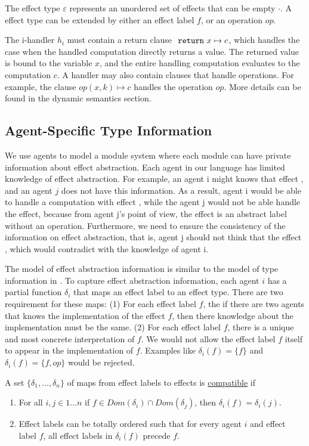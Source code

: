 The effect type $\varepsilon$ represents an unordered set of effects that can be empty $\cdot$. A effect type can be extended by either an effect label $f$, or an operation $op$.

The i-handler $h_i$ must contain a return clause $\ \texttt{return}\  x \mapsto c$, which handles the case when the handled computation directly returns a value. The returned value is bound to the variable $x$, and the entire handling computation evaluates to the computation $c$. A handler may also contain clauses that handle operations. For example, the clause $op(x, k) \mapsto c$ handles the operation $op$. More details can be found in the dynamic semantics section.

\subsection{Agent-Specific Type Information}
We use agents to model a module system where each module can have private information about effect abstraction. Each agent in our language has limited knowledge of effect abstraction. For example, an agent i might knows that effect , and an agent $j$ does not have this information. As a result, agent i would be able to handle a computation with effect , while the agent j would not be able handle the effect, because from agent j's point of view, the effect  is an abstract label without an operation. Furthermore, we need to ensure the consistency of the information on effect abstraction, that is, agent j should not think that the effect , which would contradict with the knowledge of agent i. 

The model of effect abstraction information is similar to the model of type information in \cite{grossman00}. To capture effect abstraction information, each agent $i$ has a partial function $\delta_i$ that maps an effect label to an effect type. There are two requirement for these maps: (1) For each effect label $f$, the if there are two agents that knows the implementation of the effect $f$, then there knowledge about the implementation must be the same. (2) For each effect label $f$, there is a unique and most concrete interpretation of $f$. We would not allow the effect label $f$ itself to appear in the implementation of $f$. Examples like $\delta_i(f) = \{f\}$ and $\delta_i(f) = \{f, op\}$ would be rejected.

\begin{definition}
A set $\{\delta_1, \dots, \delta_n\}$ of maps from effect labels to effects is \underline{compatible} if
\begin{enumerate}
\item For all $i, j \in 1 \dots n$ if $f \in Dom(\delta_i) \cap Dom(\delta_j)$, then $\delta_i(f) = \delta_i(j)$.
\item Effect labels can be totally ordered such that for every agent $i$ and effect label $f$, all effect labels in $\delta_i(f)$ precede $f$.
\end{enumerate}
\end{definition}

